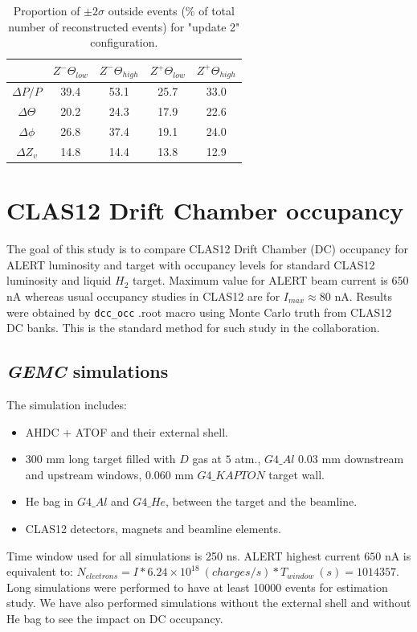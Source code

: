 \documentclass[11pt,a4paper,english]{article}
\begin{document}
\begin{table}[h!]
\centering
\begin{tabular}{|c|c|c|c|c|}
\hline
                     & \textbf{$Z^{-} \Theta_{low}$} & \textbf{$Z^{-} \Theta_{high}$} & \textbf{$Z^{+} \Theta_{low}$} & \textbf{$Z^{+} \Theta_{high}$} \\ \hline
\textbf{$\Delta P/P$}   & 39.4                  & 53.1                   & 25.7                  & 33.0                   \\ \hline
\textbf{$\Delta \Theta$} & 20.2                  & 24.3                   & 17.9                  & 22.6                   \\ \hline
\textbf{$\Delta \phi$}   & 26.8                  & 37.4                   & 19.1                  & 24.0                   \\ \hline
\textbf{$\Delta Z_v$}    & 14.8                  & 14.4                   & 13.8                  & 12.9                   \\ \hline
\end{tabular}
\caption{Proportion of $\pm 2\sigma$ outside events (\% of total number of reconstructed events) for "update 2" configuration.}
\label{table_grid_update2}
\end{table}




\newpage
\section{CLAS12 Drift Chamber occupancy}
The goal of this study is to compare CLAS12 Drift Chamber (DC) occupancy for ALERT luminosity and target with occupancy levels for standard CLAS12 luminosity and liquid $H_2$ target. Maximum value for ALERT beam current is 650 nA whereas usual occupancy studies in CLAS12 are for $I_{max} \approx 80$ nA. Results were obtained by \texttt{dcc\_occ} .root macro using Monte Carlo truth from CLAS12 DC banks. This is the standard method for such study in the collaboration.

	\subsection{\textit{GEMC} simulations}
The simulation includes:
\begin{itemize}
	\item AHDC + ATOF and their external shell.
	\item $300$ mm long target filled with $D$ gas at $5$ atm., $G4\_Al$ 0.03 mm downstream and upstream windows, 0.060 mm $G4\_KAPTON$ target wall.
	\item He bag in $G4\_Al$ and $G4\_He$, between the target and the beamline.
	\item CLAS12 detectors, magnets and beamline elements.
\end{itemize}
Time window used for all simulations is 250 ns. ALERT highest current $650$ nA is equivalent to: $N_{electrons} = I*6.24\times 10^{18} \ (charges/s) *T_ {window} \ (s) = 1014357$. Long simulations were performed to have at least 10000 events for estimation study. We have also performed simulations without the external shell and without He bag to see the impact on DC occupancy.
\end{document}
